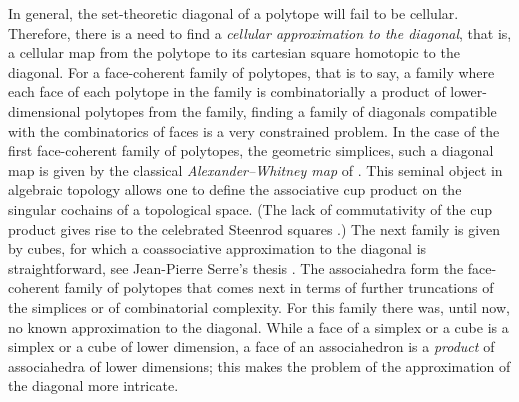 In general, the set-theoretic diagonal of a polytope will fail to be cellular. Therefore, there is a need to find a \emph{cellular approximation to the diagonal}, that is, a cellular map from the polytope to its cartesian square homotopic to the diagonal. For a face-coherent family of polytopes, that is to say, a family where each face of each polytope in the family is combinatorially a product of lower-dimensional polytopes from the family, finding a family of diagonals compatible with the combinatorics of faces
is a very constrained problem.
In the case of the first face-coherent family of polytopes, the geometric simplices, such a diagonal map is given by the classical \emph{Alexander--Whitney map} of \cite{EilenbergZilber53, EilenbergMacLane54}. This seminal object in algebraic topology allows one to define the associative cup product on the singular cochains of a topological space.
(The lack of commutativity of the cup product gives rise to the celebrated Steenrod squares \cite{Steenrod47}.) The next family is given by cubes, for which a coassociative approximation to the diagonal is straightforward, see Jean-Pierre Serre's thesis \cite{Serre51}.
The associahedra form the face-coherent family of polytopes that comes next in terms of further truncations of the simplices or of combinatorial complexity.
For this family there was, until now, no known approximation to the diagonal.
While a face of a simplex or a cube is a simplex or a cube of lower dimension, a face of an associahedron is a \emph{product} of associahedra of lower dimensions; this makes the problem of the approximation of the diagonal more intricate.
